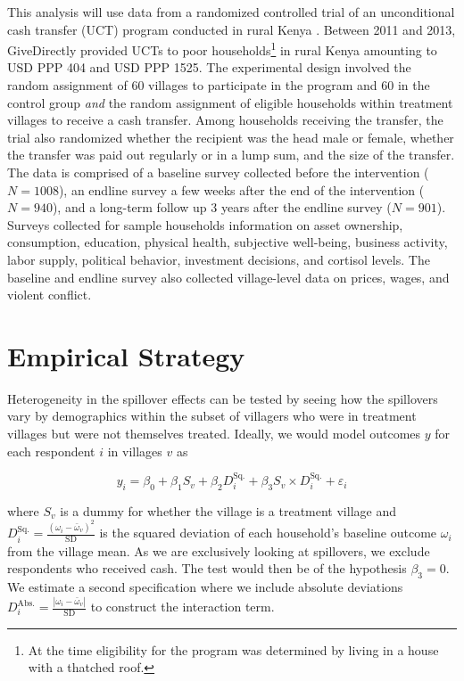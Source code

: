 \documentclass[11pt]{article}
\begin{document}
    This analysis will use data from a randomized controlled trial of an unconditional cash transfer (UCT) program conducted in rural Kenya \parencite{haushofer_short-term_2016}. Between 2011 and 2013, GiveDirectly provided UCTs to poor households\footnote{At the time eligibility for the program was determined by living in a house with a thatched roof.} in rural Kenya amounting to USD PPP 404 and USD PPP 1525. The experimental design involved the random assignment of 60 villages to participate in the program and 60 in the control group \textit{and} the random assignment of eligible households within treatment villages to receive a cash transfer. Among households receiving the transfer, the trial also randomized whether the recipient was the head male or female, whether the transfer was paid out regularly or in a lump sum, and the size of the transfer. The data is comprised of a baseline survey collected before the intervention ($N=1008$), an endline survey a few weeks after the end of the intervention ($N=940$), and a long-term follow up 3 years after the endline survey ($N=901$). Surveys collected for sample households information on asset ownership, consumption, education, physical health, subjective well-being, business activity, labor supply, political behavior, investment decisions, and cortisol levels. The baseline and endline survey also collected village-level data on prices, wages, and violent conflict.

\section{Empirical Strategy}

    Heterogeneity in the spillover effects can be tested by seeing how the spillovers vary by demographics within the subset of villagers who were in treatment villages but were not themselves treated. Ideally, we would model outcomes $y$ for each respondent $i$ in villages $v$ as

    \begin{equation*}
    y_i = \beta_0 + \beta_1 S_v + \beta_2 D^\text{Sq.}_i + \beta_3 S_v \times  D^\text{Sq.}_i + \varepsilon_i
    \end{equation*}

    where $S_v$ is a dummy for whether the village is a treatment village and $D^\text{Sq.}_i = \frac{(\omega_i - \bar{\omega}_v)^2}{\text{SD}}$ is the squared deviation of each household's baseline outcome $\omega_i$ from the village mean. As we are exclusively looking at spillovers, we exclude respondents who received cash. The test would then be of the hypothesis $\beta_3 = 0$. We estimate a second specification where we include absolute deviations $D^\text{Abs.}_i = \frac{|\omega_i - \bar{\omega}_v|}{\text{SD}}$ to construct the interaction term.
\end{document}
